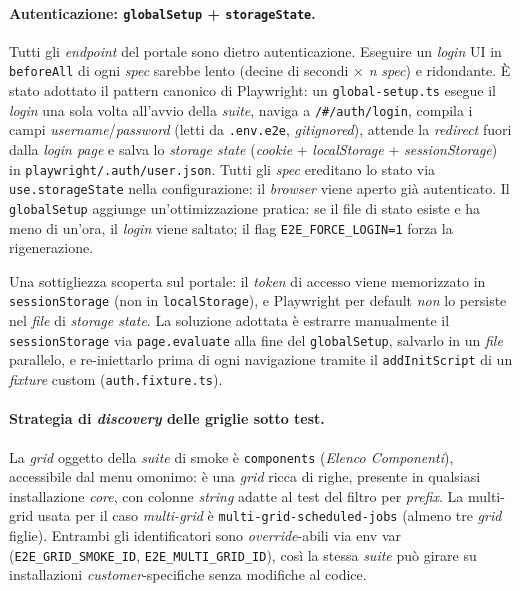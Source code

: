\paragraph{Autenticazione: \texttt{globalSetup} + \texttt{storageState}.} Tutti gli \emph{endpoint} del portale sono dietro autenticazione. Eseguire un \emph{login} UI in \texttt{beforeAll} di ogni \emph{spec} sarebbe lento (decine di secondi $\times$ \emph{n} \emph{spec}) e ridondante. È stato adottato il pattern canonico di Playwright: un \texttt{global-setup.ts} esegue il \emph{login} una sola volta all'avvio della \emph{suite}, naviga a \texttt{/\#/auth/login}, compila i campi \emph{username}/\emph{password} (letti da \texttt{.env.e2e}, \emph{gitignored}), attende la \emph{redirect} fuori dalla \emph{login page} e salva lo \emph{storage state} (\emph{cookie} + \emph{localStorage} + \emph{sessionStorage}) in \texttt{playwright/.auth/user.json}. Tutti gli \emph{spec} ereditano lo stato via \texttt{use.storageState} nella configurazione: il \emph{browser} viene aperto già autenticato. Il \texttt{globalSetup} aggiunge un'ottimizzazione pratica: se il file di stato esiste e ha meno di un'ora, il \emph{login} viene saltato; il flag \texttt{E2E\_FORCE\_LOGIN=1} forza la rigenerazione.

Una sottigliezza scoperta sul portale: il \emph{token} di accesso viene memorizzato in \texttt{sessionStorage} (non in \texttt{localStorage}), e Playwright per default \emph{non} lo persiste nel \emph{file} di \emph{storage state}. La soluzione adottata è estrarre manualmente il \texttt{sessionStorage} via \texttt{page.evaluate} alla fine del \texttt{globalSetup}, salvarlo in un \emph{file} parallelo, e re-iniettarlo prima di ogni navigazione tramite il \texttt{addInitScript} di un \emph{fixture} custom (\texttt{auth.fixture.ts}).

\paragraph{Strategia di \emph{discovery} delle griglie sotto test.} La \emph{grid} oggetto della \emph{suite} di smoke è \texttt{components} (\emph{Elenco Componenti}), accessibile dal menu omonimo: è una \emph{grid} ricca di righe, presente in qualsiasi installazione \emph{core}, con colonne \emph{string} adatte al test del filtro per \emph{prefix}. La multi-grid usata per il caso \emph{multi-grid} è \texttt{multi-grid-scheduled-jobs} (almeno tre \emph{grid} figlie). Entrambi gli identificatori sono \emph{override}-abili via env var (\texttt{E2E\_GRID\_SMOKE\_ID}, \texttt{E2E\_MULTI\_GRID\_ID}), così la stessa \emph{suite} può girare su installazioni \emph{customer}-specifiche senza modifiche al codice.

